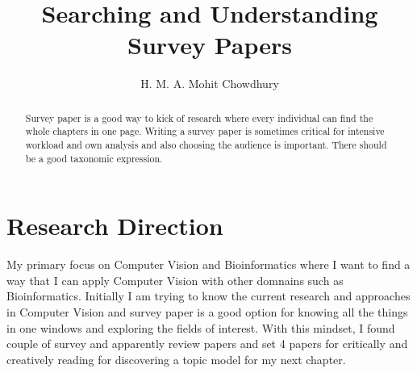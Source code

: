 




\title{Searching and Understanding Survey Papers}
\author{H. M. A. Mohit Chowdhury}
{\let\newpage\relax\maketitle}
\vspace{1pt}

\begin{abstract}
\small{Survey paper is a good way to kick of research where every individual can find the whole chapters in one page. Writing a survey paper is sometimes critical for intensive workload and own analysis and also choosing the audience is important. There should be a good taxonomic expression.}
\end{abstract}

\section{Research Direction}
My primary focus on Computer Vision and Bioinformatics where I want to find a way that I can apply Computer Vision with other domnains such as Bioinformatics. Initially I am trying to know the current research and approaches in Computer Vision and survey paper is a good option for knowing all the things in one windows and exploring the fields of interest. With this mindset, I found couple of survey and apparently review papers\cite{yoo_deep_2015,wang_generative_2021,voulodimos_deep_2018,taheri-garavand_meat_2019,patricio_computer_2018,oudah_hand_2020,noauthor_computer_nodate,li_review_2020,huang_multi-view_2019,gowrisankaran_computer_2015,feng_computer_2019,fang_computer_2020,dong_review_2021,colyer_review_2018,capitan-vallvey_recent_2015,buhrmester_analysis_2021,brunetti_computer_2018,akhtar_threat_2018,al-kaff_survey_2018} and set 4 papers\cite{colyer_review_2018,feng_computer_2019,al-kaff_survey_2018,akhtar_threat_2018} for critically and creatively reading for discovering a topic model for my next chapter.

